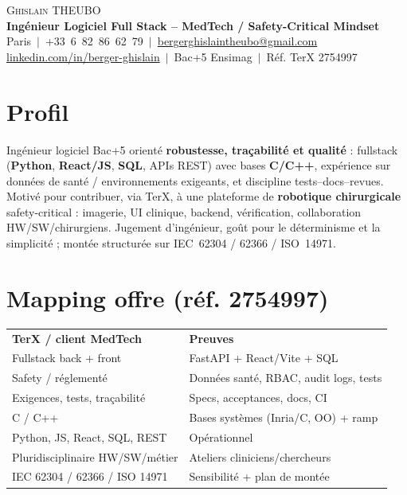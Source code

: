 \documentclass[a4paper,10.5pt]{article}
\begin{document}
\begin{center}
{\Huge \scshape Ghislain THEUBO}\\[2pt]
\textbf{Ing\'enieur Logiciel Full Stack -- MedTech / Safety-Critical Mindset}\\[2pt]
\small Paris $\,|\,$ +33~6~82~86~62~79 $\,|\,$ \href{mailto:bergerghislaintheubo@gmail.com}{bergerghislaintheubo@gmail.com}\\[1pt]
\href{https://www.linkedin.com/in/berger-ghislain}{linkedin.com/in/berger-ghislain} $\,|\,$ Bac+5 Ensimag $\,|\,$ R\'ef. TerX 2754997
\end{center}

\section{Profil}
\small{
Ing\'enieur logiciel Bac+5 orient\'e \textbf{robustesse, tra\c{c}abilit\'e et qualit\'e} : fullstack
(\textbf{Python}, \textbf{React/JS}, \textbf{SQL}, APIs REST) avec bases \textbf{C/C++}, exp\'erience
sur donn\'ees de sant\'e / environnements exigeants, et discipline tests--docs--revues.
Motiv\'e pour contribuer, via TerX, \`a une plateforme de \textbf{robotique chirurgicale}
safety-critical : imagerie, UI clinique, backend, v\'erification, collaboration HW/SW/chirurgiens.
Jugement d'ing\'enieur, go\^ut pour le d\'eterminisme et la simplicit\'e ; mont\'ee structur\'ee
sur IEC~62304 / 62366 / ISO~14971.
}

\section{Mapping offre (r\'ef. 2754997)}
\small{
\begin{tabular*}{0.97\textwidth}{@{}p{}@{\extracolsep{\fill}}p{}@{}}
\textbf{TerX / client MedTech} & \textbf{Preuves} \\
Fullstack back + front & FastAPI + React/Vite + SQL \\
Safety / r\'eglement\'e & Donn\'ees sant\'e, RBAC, audit logs, tests \\
Exigences, tests, tra\c{c}abilit\'e & Specs, acceptances, docs, CI \\
C / C++ & Bases syst\`emes (Inria/C, OO) + ramp \\
Python, JS, React, SQL, REST & Op\'erationnel \\
Pluridisciplinaire HW/SW/m\'etier & Ateliers cliniciens/chercheurs \\
IEC 62304 / 62366 / ISO 14971 & Sensibilit\'e + plan de mont\'ee \\
\end{tabular*}
}
\end{document}
